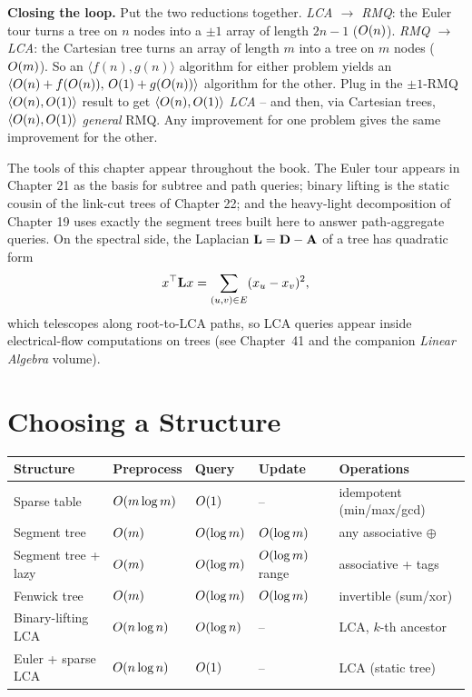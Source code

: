 \begin{whybox}
\textbf{Closing the loop.} Put the two reductions together. \emph{LCA $\to$ RMQ}: the Euler
tour turns a tree on $n$ nodes into a $\pm1$ array of length $2n-1$ ($O(n)$).
\emph{RMQ $\to$ LCA}: the Cartesian tree turns an array of length $m$ into a tree on $m$
nodes ($O(m)$). So an $\langle f(n),g(n)\rangle$ algorithm for either problem yields an
$\langle O(n)+f(O(n)),\,O(1)+g(O(n))\rangle$ algorithm for the other. Plug in the
$\pm1$-RMQ $\langle O(n),O(1)\rangle$ result to get $\langle O(n),O(1)\rangle$
\emph{LCA} -- and then, via Cartesian trees, $\langle O(n),O(1)\rangle$ \emph{general}
RMQ. Any improvement for one problem gives the same improvement for the other.
\end{whybox}

\begin{connectionbox}
The tools of this chapter appear throughout the book. The Euler tour appears in Chapter 21 as
the basis for subtree and path queries; binary lifting is the static cousin of the link-cut
trees of Chapter 22; and the heavy-light decomposition of Chapter 19 uses exactly the segment
trees built here to answer path-aggregate queries. On the spectral side, the Laplacian $\mathbf{L}=\mathbf{D}-\mathbf{A}$ of a tree has quadratic form
\[
x^\top \mathbf{L} x = \sum_{(u,v)\in E}(x_u-x_v)^2,
\]
which telescopes along root-to-LCA paths, so
LCA queries appear inside electrical-flow computations on trees (see
Chapter~41 and the companion \emph{Linear Algebra} volume).
\end{connectionbox}

\section{Choosing a Structure}
\label{ch23:choosing}

\begin{center}
\renewcommand{\arraystretch}{1.3}
\begin{tabular}{@{}lllll@{}}
\toprule
Structure & Preprocess & Query & Update & Operations\\
\midrule
Sparse table        & $O(m\log m)$ & $O(1)$       & --                  & idempotent (min/max/gcd)\\
Segment tree        & $O(m)$       & $O(\log m)$  & $O(\log m)$       & any associative $\oplus$\\
Segment tree + lazy & $O(m)$       & $O(\log m)$  & $O(\log m)$ range & associative + tags\\
Fenwick tree        & $O(m)$       & $O(\log m)$  & $O(\log m)$       & invertible (sum/xor)\\
Binary-lifting LCA  & $O(n\log n)$ & $O(\log n)$  & --                  & LCA, $k$-th ancestor\\
Euler + sparse LCA  & $O(n\log n)$ & $O(1)$       & --                  & LCA (static tree)\\
\bottomrule
\end{tabular}
\end{center}

